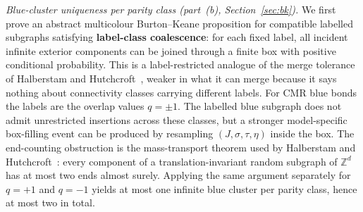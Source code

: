 \documentclass[11pt]{article}
\numberwithin{theorem}{section}
\theoremstyle{remark}
\begin{document}
\smallskip\noindent
\textit{Blue-cluster uniqueness per parity class (part~(b), Section~\ref{sec:bk}).}
We first prove an abstract multicolour Burton--Keane proposition for compatible labelled subgraphs satisfying \textbf{label-class coalescence}: for each fixed label, all incident infinite exterior components can be joined through a finite box with positive conditional probability.
This is a label-restricted analogue of the merge tolerance of Halberstam and Hutchcroft~\cite[Lemma~3.4]{HH2023}, weaker in what it can merge because it says nothing about connectivity classes carrying different labels.
For CMR blue bonds the labels are the overlap values $q=\pm1$.
The labelled blue subgraph does not admit unrestricted insertions across these classes, but a stronger model-specific box-filling event can be produced by resampling $(J,\sigma,\tau,\eta)$ inside the box.
The end-counting obstruction is the mass-transport theorem used by Halberstam and Hutchcroft~\cite[Proposition~3.3]{HH2023}: every component of a translation-invariant random subgraph of $\mathbb{Z}^d$ has at most two ends almost surely.
Applying the same argument separately for $q=+1$ and $q=-1$ yields at most one infinite blue cluster per parity class, hence at most two in total.
\end{document}
